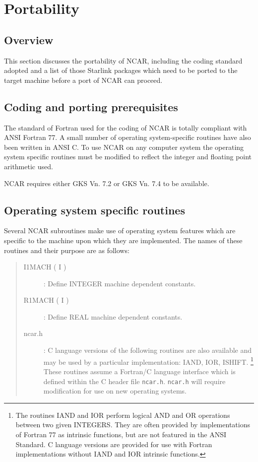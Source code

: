 \documentclass[twoside,11pt]{article}
\renewcommand{\_}{\texttt{\symbol{95}}}
\begin{document}
\newpage

\section{Portability}

\subsection{Overview}

This section discusses the portability of NCAR, including the coding 
standard adopted and a list of those Starlink packages which 
need to be ported to the target machine before a port of NCAR can proceed.


\subsection{Coding and porting prerequisites}

The standard of Fortran used for the coding of NCAR is totally
compliant with ANSI Fortran 77.
A small number of operating system-specific routines have also been written
in ANSI C.
To use NCAR on any computer system the operating system specific routines
must be modified to reflect the integer and floating point arithmetic used.

NCAR requires either GKS Vn. 7.2 or GKS Vn. 7.4 to be available.


\subsection{Operating system specific routines}

Several NCAR subroutines make use of operating system features which are
specific to the machine upon which they are implemented.
The names of these routines and their purpose are as follows:

\begin {quote}
\begin {description}
\item [I1MACH ( I )]:
Define INTEGER machine dependent constants.

\item [R1MACH ( I )]:
Define REAL machine dependent constants.

\item [ncar.h]:
C language versions of the following routines are also available
and may be used by a particular implementation: IAND, IOR, ISHIFT.
\footnote{The routines IAND and IOR
perform logical AND and OR operations between two given INTEGERS. 
They are  often provided by implementations of Fortran 77 as intrinsic
functions, but are not featured in the ANSI Standard.
C language versions are provided for use with Fortran implementations without
IAND and IOR intrinsic functions.}
These routines assume a Fortran/C language interface which is defined
within the C header file \texttt{ncar.h}.
\texttt{ncar.h} will require modification for use on new operating systems.

\end {description}
\end {quote}

\end{document}

